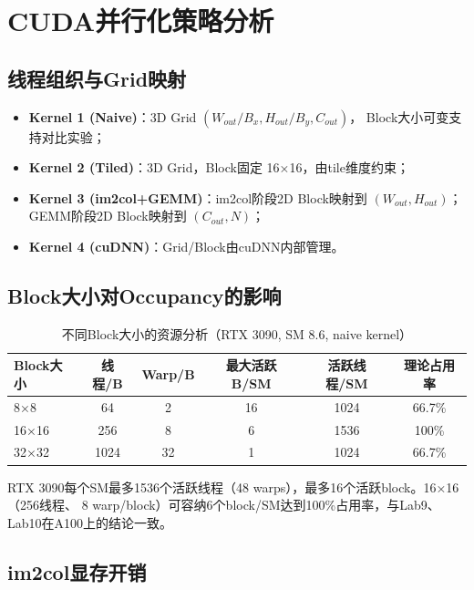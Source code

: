 \documentclass[UTF8,a4paper,12pt,fontset=none]{ctexart}
\begin{document}
\section{CUDA并行化策略分析}

\subsection{线程组织与Grid映射}

\begin{itemize}
  \item \textbf{Kernel 1 (Naive)}：3D Grid $(W_{out}/B_x, H_{out}/B_y, C_{out})$，
        Block大小可变支持对比实验；
  \item \textbf{Kernel 2 (Tiled)}：3D Grid，Block固定 16×16，由tile维度约束；
  \item \textbf{Kernel 3 (im2col+GEMM)}：im2col阶段2D Block映射到 $(W_{out}, H_{out})$；
        GEMM阶段2D Block映射到 $(C_{out}, N)$；
  \item \textbf{Kernel 4 (cuDNN)}：Grid/Block由cuDNN内部管理。
\end{itemize}

\subsection{Block大小对Occupancy的影响}

\begin{table}[H]
  \centering
  \caption{不同Block大小的资源分析（RTX 3090, SM 8.6, naive kernel）}
  \label{tab:occupancy}
  \begin{tabular}{lccccc}
    \toprule
    Block大小 & 线程/B & Warp/B & 最大活跃B/SM & 活跃线程/SM & 理论占用率 \\
    \midrule
    8×8   & 64   & 2  & 16 & 1024  & 66.7\% \\
    16×16 & 256  & 8  & 6  & 1536  & 100\% \\
    32×32 & 1024 & 32 & 1  & 1024  & 66.7\% \\
    \bottomrule
  \end{tabular}
\end{table}

RTX 3090每个SM最多1536个活跃线程（48 warps），最多16个活跃block。16×16（256线程、
8 warp/block）可容纳6个block/SM达到100\%占用率，与Lab9、Lab10在A100上的结论一致。

\subsection{im2col显存开销}
\end{document}
